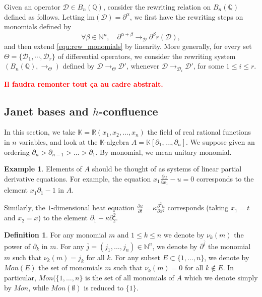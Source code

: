 \documentclass[10pt]{easychair}
\theoremstyle{definition}
\newtheorem{definition}[theorem]{Definition}
\newtheorem{example}[theorem]{Example}
\newcommand\secTroisDeux{Janet bases and $h$-confluence}
\newcommand\todo[1]{{\bf\textcolor{red}{#1.}}}
\newcommand\D{\mathcal{D}}
\newcommand\lm{\text{lm}}
\newcommand\K{\mathbb{K}}
\newcommand\Q{\mathbb{Q}}
\newcommand\N{\mathbb{N}}
\newcommand\Weyl{B_n(\Q)}
\newcommand\rewTheta{\to_{\Theta}}
\begin{document}
Given an operator $\D\in\Weyl$, consider the rewriting relation on
$\Weyl$ defined as follows. Letting $\lm(\D)=\partial^{\alpha}$, we first
have the rewriting steps on monomials defined by
\begin{equation}\label{equ:rew_monomials}
  \forall\beta\in\N^n,\quad\partial^{\alpha+\beta}
  \to_{\D}\partial^{\beta}r(\D),\end{equation}
and then extend \eqref{equ:rew_monomials} by linearity. More generally,
for every set $\Theta=\{\D_1,\cdots,\D_r\}$ of differential operators, we
consider the rewriting system $(\Weyl,\rewTheta)$ defined by
$\D\rewTheta\D'$, whenever $\D\to_{\D_i}\D'$, for some $1\leq i\leq r$.

\todo{Il faudra remonter tout ça au cadre abstrait}

\subsection{\secTroisDeux}\label{sec:troisDeux}

In this section, we take $\K = \mathbb R(x_1,x_2,\ldots,x_n)$ the field of real rational functions in $n$ variables, and look at the $\K$-algebra $A = \K[\partial_1,\ldots,\partial_n]$. We suppose given an ordering $\partial_n > \partial_{n-1} > \ldots > \partial_1$. By monomial, we mean unitary monomial.

\begin{example}
  Elements of $A$ should be thought of as systems of linear partial derivative equations. For example, the equation $x_1 \frac{\partial u}{\partial x_1} - u = 0$ corresponds to the element $x_1 \partial_1 - 1$ in $A$.

  Similarly, the $1$-dimensional heat equation $\frac{\partial u}{\partial t} = \kappa \frac{\partial^2 u}{\partial x^2}$  corresponds (taking $x_1 = t$ and $x_2 = x$) to the element $\partial_1 - \kappa \partial_2^2$.
\end{example}

\begin{definition}
 For any monomial $m$ and $1 \leq k \leq n$ we denote by $\nu_k(m)$ the power of $\partial_k$ in $m$.
For any $\overline j =(j_1,\ldots,j_n) \in \mathbb N^n$, we denote by $\partial^{\overline j}$ the monomial $m$ such that $\nu_k(m) = j_k$ for all $k$. For any subset $E \subset \{1,\ldots,n\}$, we denote by $Mon(E)$ the set of monomials $m$ such that $\nu_k(m) = 0$ for all $k \notin E$. In particular, $Mon(\{1,\ldots,n\}$ is the set of all monomials of $A$ which we denote simply by $Mon$, while $Mon(\emptyset)$ is reduced to $\{1\}$. 
\end{definition}
\end{document}
